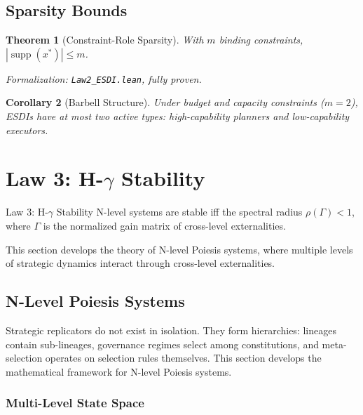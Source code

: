 \documentclass[12pt]{article}
\newtheorem{theorem}{Theorem}[section]
\newtheorem{corollary}[theorem]{Corollary}
\DeclareMathOperator{\supp}{supp}
\begin{document}
\subsection{Sparsity Bounds}

\begin{theorem}[Constraint-Role Sparsity]
\label{thm:sparsity}
With $m$ binding constraints, $|\supp(x^*)| \leq m$.
\end{theorem}
\noindent\textit{Formalization: \texttt{Law2\_ESDI.lean}, fully proven.}

\begin{corollary}[Barbell Structure]
Under budget and capacity constraints ($m = 2$), ESDIs have at most two active types: high-capability planners and low-capability executors.
\end{corollary}



\section{Law 3: H-$\gamma$ Stability}
\label{sec:law3}

\begin{lawbox}{Law 3: H-$\gamma$ Stability}
N-level systems are stable iff the spectral radius $\rho(\Gamma) < 1$, where $\Gamma$ is the normalized gain matrix of cross-level externalities.
\end{lawbox}

This section develops the theory of N-level Poiesis systems, where multiple levels of strategic dynamics interact through cross-level externalities.

\subsection{N-Level Poiesis Systems}
\label{sec:n-level}

Strategic replicators do not exist in isolation. They form hierarchies: lineages contain sub-lineages, governance regimes select among constitutions, and meta-selection operates on selection rules themselves. This section develops the mathematical framework for N-level Poiesis systems.

\subsubsection{Multi-Level State Space}
\end{document}
